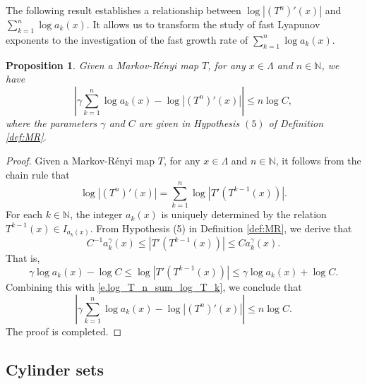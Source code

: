 \documentclass[12pt,reqno]{amsart}
\renewcommand{\=}{\coloneqq}
\theoremstyle{plain}
\newtheorem{proposition}[theorem]{Proposition}
\begin{document}
The following result establishes a relationship between $\log|(T^n)'(x)|$ and $\sum_{k=1}^n\log a_k(x)$. It allows us to transform the study of fast Lyapunov exponents to the investigation of the fast growth rate of $\sum_{k=1}^n\log a_k(x)$.


\begin{proposition}\label{l.Transformation}
               Given a Markov-R\'{e}nyi map $T$, for any $x\in \Lambda$ and $n \in \mathbb N$, we have
        \begin{equation*}\label{e.O(n)}
               \left|\gamma\sum_{k=1}^n\log a_k(x)-\log|(T^n)'(x)|\right|
                \leq n\log C,
        \end{equation*}
        where the parameters $\gamma$ and $C$ are given in Hypothesis $(5)$ of Definition \ref{def:MR}.
\end{proposition}

\begin{proof}
Given a Markov-R\'{e}nyi map $T$, for any $x\in  \Lambda$ and $n\in \mathbb N$, it follows from the chain rule that
        \begin{equation}\label{e.log_T_n_sum_log_T_k}
                \log|(T^n)'(x)|=
                \sum_{k=1}^n\log
                |T'(T^{k-1}(x))|.
        \end{equation}
For each $k \in \mathbb N$, the integer $a_k(x)$ is uniquely determined by the relation $T^{k-1}(x)\in I_{a_k(x)}$. From Hypothesis (5) in Definition \ref{def:MR}, we derive that
 \begin{equation*}\label{e.estimation_a_k_R^k-1}
                C^{-1}a_k^{\gamma}(x)\leq |T'(T^{k-1}(x))|\leq Ca_k^{\gamma}(x).
 \end{equation*}
That is,
        \begin{equation*}\label{e.estimation_log_a_k_R^k-1}
                \gamma\log a_{k}(x)-\log C\leq \log |T'(T^{k-1}(x))|\leq \gamma\log a_{k}(x)+\log C.
        \end{equation*}
Combining this with \eqref{e.log_T_n_sum_log_T_k}, we conclude that
\begin{equation*}
                \left|\gamma\sum_{k=1}^n\log
                a_k(x)-\log|(T^n)'(x)|\right|
                \leq n\log C.
        \end{equation*}
The proof is completed.
\end{proof}


\subsection{Cylinder sets}
\end{document}
